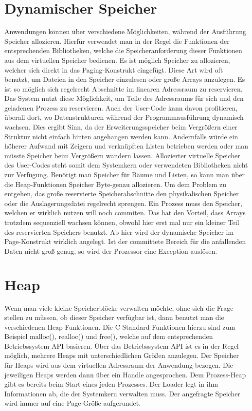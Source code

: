 \documentclass[12pt]{book}
\begin{document}
\section{Dynamischer Speicher}
Anwendungen können über verschiedene Möglichkeiten, während der Ausführung
Speicher allozieren. Hierfür verwendet man in der Regel die Funktionen der
entsprechenden Bibliotheken, welche die Speicheranforderung dieser Funktionen
aus dem virtuellen Speicher bedienen. Es ist möglich Speicher zu allozieren,
welcher sich direkt in das Paging-Konstrukt eingefügt. Diese Art wird oft
benutzt, um Dateien in den Speicher einzulesen oder große Arrays anzulegen. Es
ist so möglich sich regelrecht Abschnitte im linearen Adressraum zu reservieren.
Das System nutzt diese Möglichkeit, um Teile des Adressraums für sich und den
geladenen Prozess zu reservieren. Auch der User-Code kann davon profitieren,
überall dort, wo Datenstrukturen während der Programmausführung dynamisch
wachsen. Dies ergibt Sinn, da der Erweiterungsspeicher beim Vergrößern einer
Struktur nicht einfach hinten angehangen werden kann. Andernfalls würde ein
höherer Aufwand mit Zeigern und verknüpften Listen betrieben werden oder man
müsste Speicher beim Vergrößern wandern lassen. Allozierter virtuelle Speicher
des User-Codes steht somit dem Systemkern oder verwendeten Bibliotheken nicht
zur Verfügung. Benötigt man Speicher für Bäume und Listen, so kann man über die
Heap-Funktionen Speicher Byte-genau allozieren. Um dem Problem zu entgehen, das
große reservierte Speicherabschnitte den physikalischen Speicher oder die
Auslagerungsdatei regelrecht sprengen. Ein Prozess muss den Speicher, welchen er
wirklich nutzen will noch commiten. Das hat den Vorteil, dass Arrays trotzdem
sequenziell wachsen können, obwohl hier erst mal nur ein kleiner Teil des
reservierten Speichers benutzt. Ab hier wird der dynamische Speicher im
Page-Konstrukt wirklich angelegt. Ist der committete Bereich für die anfallenden
Daten nicht groß genug, so wird der Prozessor eine Exception auslösen.

\section{Heap}
Wenn man viele kleine Speicherblöcke verwalten möchte, ohne sich die Frage
stellen zu müssen, ob dieser Speicher verfügbar ist, dann benutzt man die
verschiedenen Heap-Funktionen. Die C-Standard-Funktionen hierzu sind zum
Beispiel malloc(), realloc() und free(), welche auf dem entsprechenden
Betriebssystem-API basieren. Über das Betriebssystem-API ist es in der Regel
möglich, mehrere Heaps mit unterschiedlichen Größen anzulegen. Der Speicher für
Heaps wird aus dem virtuellen Adressraum der Anwendung bezogen. Die jeweiligen
Heaps werden dann über ein Handle angesprochen. Dem Prozess-Heap gibt es bereits
beim Start eines jeden Prozesses. Der Loader legt in ihm Informationen ab, die
der Systemkern verwalten muss. Der angefragte Speicher wird immer auf eine
Page-Größe aufgerundet.
\end{document}
